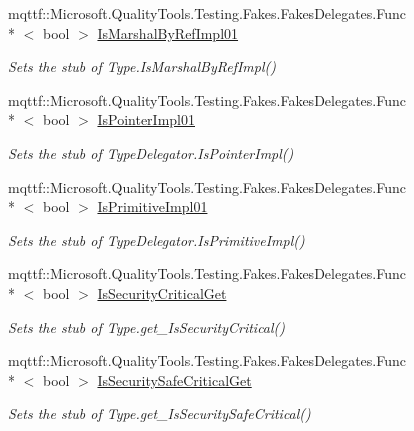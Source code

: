 \begin{DoxyCompactItemize}
mqttf\-::\-Microsoft.\-Quality\-Tools.\-Testing.\-Fakes.\-Fakes\-Delegates.\-Func\\*
$<$ bool $>$ \hyperlink{class_system_1_1_reflection_1_1_fakes_1_1_stub_type_delegator_a6658b273d2de19f906f023328eababed}{Is\-Marshal\-By\-Ref\-Impl01}
\begin{DoxyCompactList}\small\item\em Sets the stub of Type.\-Is\-Marshal\-By\-Ref\-Impl()\end{DoxyCompactList}\item 
mqttf\-::\-Microsoft.\-Quality\-Tools.\-Testing.\-Fakes.\-Fakes\-Delegates.\-Func\\*
$<$ bool $>$ \hyperlink{class_system_1_1_reflection_1_1_fakes_1_1_stub_type_delegator_a739990adfdda291649346840848889fd}{Is\-Pointer\-Impl01}
\begin{DoxyCompactList}\small\item\em Sets the stub of Type\-Delegator.\-Is\-Pointer\-Impl()\end{DoxyCompactList}\item 
mqttf\-::\-Microsoft.\-Quality\-Tools.\-Testing.\-Fakes.\-Fakes\-Delegates.\-Func\\*
$<$ bool $>$ \hyperlink{class_system_1_1_reflection_1_1_fakes_1_1_stub_type_delegator_a9bfa6234dc10a36e2b0f52ac69147085}{Is\-Primitive\-Impl01}
\begin{DoxyCompactList}\small\item\em Sets the stub of Type\-Delegator.\-Is\-Primitive\-Impl()\end{DoxyCompactList}\item 
mqttf\-::\-Microsoft.\-Quality\-Tools.\-Testing.\-Fakes.\-Fakes\-Delegates.\-Func\\*
$<$ bool $>$ \hyperlink{class_system_1_1_reflection_1_1_fakes_1_1_stub_type_delegator_a152b335ab87c5090ffc4f754f4e97bde}{Is\-Security\-Critical\-Get}
\begin{DoxyCompactList}\small\item\em Sets the stub of Type.\-get\-\_\-\-Is\-Security\-Critical()\end{DoxyCompactList}\item 
mqttf\-::\-Microsoft.\-Quality\-Tools.\-Testing.\-Fakes.\-Fakes\-Delegates.\-Func\\*
$<$ bool $>$ \hyperlink{class_system_1_1_reflection_1_1_fakes_1_1_stub_type_delegator_a7950a95a365c5f0e4e314986c98e50c3}{Is\-Security\-Safe\-Critical\-Get}
\begin{DoxyCompactList}\small\item\em Sets the stub of Type.\-get\-\_\-\-Is\-Security\-Safe\-Critical()\end{DoxyCompactList}\item 

\end{DoxyCompactItemize}
